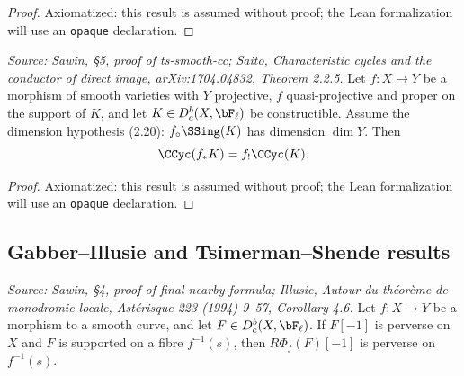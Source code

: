 \begin{proof}
  Axiomatized: this result is assumed without proof; the Lean formalization will use
  an \texttt{opaque} declaration.
\end{proof}

\begin{theorem}
  \label{thm:saito_direct_pushforward}
  \textit{Source: Sawin, §5, proof of ts-smooth-cc; Saito,
  \emph{Characteristic cycles and the conductor of direct image},
  arXiv:1704.04832, Theorem 2.2.5.}
  Let $f:X\to Y$ be a morphism of smooth varieties with $Y$ projective, $f$
  quasi-projective and proper on the support of $K$, and let
  $K\in D^b_c(X,\bF_\ell)$ be constructible.  Assume the dimension hypothesis
  (2.20): $f_\circ\SSing(K)$ has dimension $\dim Y$.  Then
  \[ \CCyc(f_*K) = f_!\CCyc(K). \]
\end{theorem}

\begin{proof}
  Axiomatized: this result is assumed without proof; the Lean formalization will use
  an \texttt{opaque} declaration.
\end{proof}

\subsection{Gabber--Illusie and Tsimerman--Shende results}

\begin{lemma}
  \label{lem:gabber_illusie}
  \textit{Source: Sawin, §4, proof of final-nearby-formula; Illusie,
  \emph{Autour du théorème de monodromie locale}, Astérisque 223 (1994) 9--57,
  Corollary 4.6.}
  Let $f:X\to Y$ be a morphism to a smooth curve, and let $F\in D^b_c(X,\bF_\ell)$.
  If $F[-1]$ is perverse on $X$ and $F$ is supported on a fibre $f^{-1}(s)$, then
  $R\Phi_f(F)[-1]$ is perverse on $f^{-1}(s)$.
\end{lemma}


